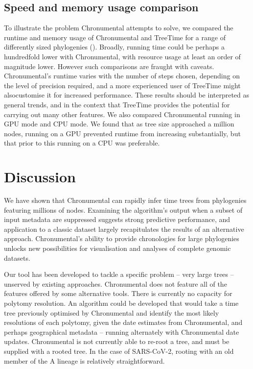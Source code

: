 \subsection*{Speed and memory usage comparison}
To illustrate the problem Chronumental attempts to solve, we compared the runtime and memory usage of Chronumental and TreeTime for a range of differently sized phylogenies (). Broadly, running time could be perhaps a hundredfold lower with Chronumental, with resource usage at least an order of magnitude lower. However such comparisons are fraught with caveats. Chronumental's runtime varies with the number of steps chosen, depending on the level of precision required, and a more experienced user of TreeTime might alsocustomise it for increased performance. These results should be interpreted as general trends, and in the context that TreeTime provides the potential for carrying out many other features. We also compared Chronumental running in GPU mode and CPU mode. We found that as tree size approached a million nodes, running on a GPU prevented runtime from increasing substantially, but that prior to this running on a CPU was preferable.




\section*{Discussion}

We have shown that Chronumental can rapidly infer time trees from phylogenies featuring millions of nodes. Examining the algorithm's output when a subset of input metadata are suppressed suggests strong predictive performance, and application to a classic dataset largely recapitulates the results of an alternative approach. Chronumental's ability to provide chronologies for large phylogenies unlocks new possibilities for visualisation and analyses of complete genomic datasets.

Our tool has been developed to tackle a specific problem -- very large trees -- unserved by existing approaches. Chronumental does not feature all of the features offered by some alternative tools. There is currently no capacity for polytomy resolution. An algorithm could be developed that would take a time tree previously optimised by Chronumental and identify the most likely resolutions of each polytomy, given the date estimates from Chronumental, and perhaps geographical metadata -- running alternately with Chronumental date updates.  Chronumental is not currently able to re-root a tree, and must be supplied with a rooted tree. In the case of SARS-CoV-2, rooting with an old member of the A lineage is relatively straightforward.

